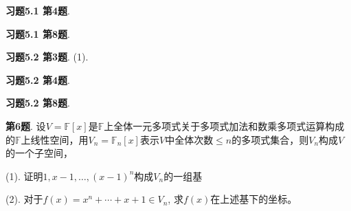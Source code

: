 
\renewcommand{\newpageorvspace}{\vspace{2em}}

\date{2021-11-26  第五次习题课}



\maketitle

{\bf 习题5.1 第4题}. 

\newpageorvspace


{\bf 习题5.1 第8题}. 

\newpageorvspace


{\bf 习题5.2 第3题}. (1). 

\newpageorvspace


{\bf 习题5.2 第4题}. 

\newpageorvspace


{\bf 习题5.2 第8题}. 

\newpageorvspace


{\bf 第6题}. 设$V = \mathbb{F}[x]$是$\mathbb{F}$上全体一元多项式关于多项式加法和数乘多项式运算构成的$\mathbb{F}$上线性空间，用$V_n = \mathbb{F}_n[x]$表示$V$中全体次数$\leqslant n$的多项式集合，则$V_n$构成$V$的一个子空间，

(1). 证明$1, x-1, \ldots, (x-1)^n$构成$V_n$的一组基

(2). 对于$f(x) = x^n + \cdots + x + 1 \in V_n$, 求$f(x)$在上述基下的坐标。

\newpageorvspace



